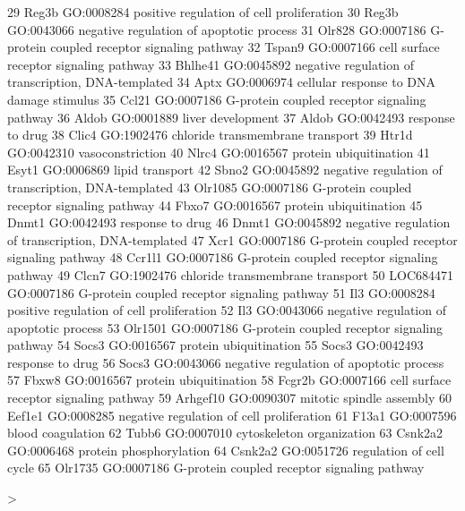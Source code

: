 \documentclass[12pt]{article}
\begin{document}
\begin{Schunk}
\begin{Soutput}
29       Reg3b GO:0008284           positive regulation of cell proliferation
30       Reg3b GO:0043066            negative regulation of apoptotic process
31      Olr828 GO:0007186        G-protein coupled receptor signaling pathway
32      Tspan9 GO:0007166             cell surface receptor signaling pathway
33     Bhlhe41 GO:0045892 negative regulation of transcription, DNA-templated
34        Aptx GO:0006974            cellular response to DNA damage stimulus
35       Ccl21 GO:0007186        G-protein coupled receptor signaling pathway
36       Aldob GO:0001889                                   liver development
37       Aldob GO:0042493                                    response to drug
38       Clic4 GO:1902476                    chloride transmembrane transport
39       Htr1d GO:0042310                                    vasoconstriction
40       Nlrc4 GO:0016567                              protein ubiquitination
41       Esyt1 GO:0006869                                     lipid transport
42       Sbno2 GO:0045892 negative regulation of transcription, DNA-templated
43     Olr1085 GO:0007186        G-protein coupled receptor signaling pathway
44       Fbxo7 GO:0016567                              protein ubiquitination
45       Dnmt1 GO:0042493                                    response to drug
46       Dnmt1 GO:0045892 negative regulation of transcription, DNA-templated
47        Xcr1 GO:0007186        G-protein coupled receptor signaling pathway
48      Ccr1l1 GO:0007186        G-protein coupled receptor signaling pathway
49       Clcn7 GO:1902476                    chloride transmembrane transport
50   LOC684471 GO:0007186        G-protein coupled receptor signaling pathway
51         Il3 GO:0008284           positive regulation of cell proliferation
52         Il3 GO:0043066            negative regulation of apoptotic process
53     Olr1501 GO:0007186        G-protein coupled receptor signaling pathway
54       Socs3 GO:0016567                              protein ubiquitination
55       Socs3 GO:0042493                                    response to drug
56       Socs3 GO:0043066            negative regulation of apoptotic process
57       Fbxw8 GO:0016567                              protein ubiquitination
58      Fcgr2b GO:0007166             cell surface receptor signaling pathway
59    Arhgef10 GO:0090307                            mitotic spindle assembly
60      Eef1e1 GO:0008285           negative regulation of cell proliferation
61       F13a1 GO:0007596                                   blood coagulation
62       Tubb6 GO:0007010                           cytoskeleton organization
63     Csnk2a2 GO:0006468                             protein phosphorylation
64     Csnk2a2 GO:0051726                            regulation of cell cycle
65     Olr1735 GO:0007186        G-protein coupled receptor signaling pathway
\end{Soutput}
\begin{Sinput}
> 
\end{Sinput}
\end{Schunk}
\end{document}
